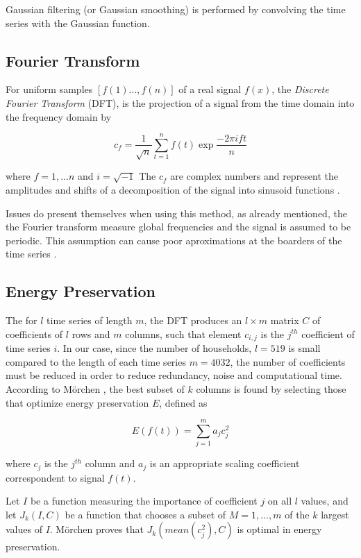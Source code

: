 Gaussian filtering (or Gaussian smoothing) is performed by convolving the time series with the Gaussian function.




\subsection{Fourier Transform}

For uniform samples $[f(1)...,f(n)]$ of a real signal $f(x)$, the \textit{Discrete Fourier Transform} (DFT), is the projection of a signal from the time domain into the frequency domain by

\[c_f=\frac{1}{\sqrt{n}}\sum_{t=1}^nf(t)\exp{\frac{-2\pi ift}{n}}\]

where $f=1,...n$ and $i=\sqrt{-1}$ The $c_f$ are complex numbers and represent
the amplitudes and shifts of a decomposition of the signal into sinusoid functions \cite{Moerchen}.


Issues do present themselves when using this method, as already mentioned, the the Fourier transform measure global frequencies and the signal is assumed to be periodic. This assumption can cause poor aproximations at the boarders of the time series \cite{Moerchen}.

\subsection{Energy Preservation}

The for $l$ time series of length $m$, the DFT produces an $l \times m$ matrix $C $ of coefficients of $l$ rows and $m$ columns, such that element $c_{i,j}$ is the $j^{th}$ coefficient of time series $i$. In our case, since the number of households, $l=519$ is small compared to the length of each time series $m=4032$, the number of coefficients must be reduced in order to reduce redundancy, noise and computational time. According to Mörchen \cite{Moerchen}, the best subset of $k$ columns is found by selecting those that optimize energy preservation $E$, defined as

\[E(f(t))=\sum_{j=1}^ma_jc^2_j\] 

where $c_j$ is the $j^{th}$ column and $a_j$ is an appropriate scaling coefficient correspondent to signal $f(t)$. 

Let $I$ be a function measuring the importance of coefficient $j$ on all $l$ values, and let $J_k(I,C)$ be a function that chooses a subset of $M = {1, ..., m}$ of the $k$ largest values of $I$. Mörchen \cite{Moerchen} proves that $J_k(mean(c_j^2),C)$ is optimal in energy preservation.

